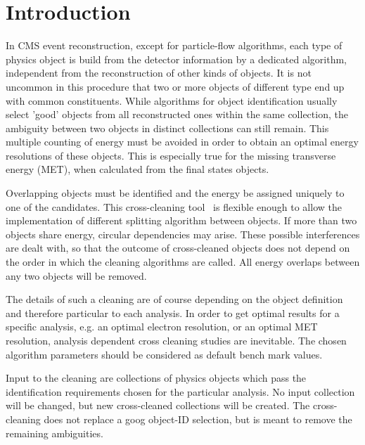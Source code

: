 \documentclass{cmspaper}
\begin{document}
\setcounter{page}{2}%


\newpage
\section{Introduction}

In CMS event reconstruction, except for particle-flow algorithms, each type of
physics object is build from the detector information by a dedicated algorithm,
independent from the reconstruction of other kinds of objects. It is not
uncommon in this procedure that two or more objects of different type end up
with common constituents.  While algorithms for object identification usually
select 'good' objects from all reconstructed ones within the same collection,
the ambiguity between two objects in distinct collections can still remain.
This multiple counting of energy must be avoided in order to obtain an optimal
energy resolutions of these objects. This is especially true for the missing
transverse energy (MET), when calculated from the final states objects.

Overlapping objects must be identified and the energy be assigned uniquely to
one of the candidates. This cross-cleaning tool~\cite{package} is flexible enough to allow the
implementation of different splitting algorithm between objects. If more than
two objects share energy, circular dependencies may arise. These possible
interferences are dealt with, so that the outcome of cross-cleaned objects does
not depend on the order in which the cleaning algorithms are called.
All energy overlaps between any two objects will be removed.

The details of such a cleaning are of course depending on the object definition
and therefore particular to each analysis. In order to get optimal results for
a specific analysis, e.g. an optimal electron resolution, or an optimal MET
resolution, analysis dependent cross cleaning studies are inevitable. The
chosen algorithm parameters should be considered as default bench mark values.

Input to the cleaning are collections of physics objects which pass the
identification requirements chosen for the particular analysis. No input
collection will be changed, but new cross-cleaned collections will be created.
The cross-cleaning does not replace a goog object-ID selection, but is meant to
remove the remaining ambiguities.
\end{document}
